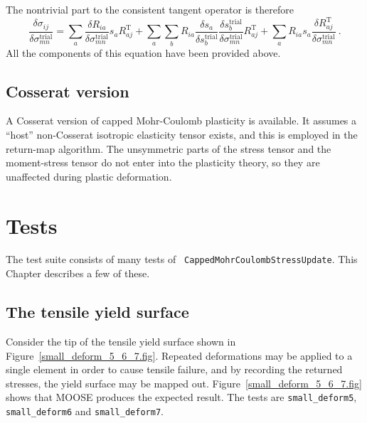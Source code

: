 \documentclass[]{scrreprt}
\begin{document}
The nontrivial part to the consistent tangent operator is therefore
\begin{equation}
  \frac{\delta \sigma_{ij}}{\delta\sigma_{mn}^{\mathrm{trial}}} =
\sum_{a}  \frac{\delta
    R_{ia}}{\delta\sigma_{mn}^{\mathrm{trial}}}s_{a}R_{aj}^{\mathrm{T}}
  + \sum_{a}\sum_{b} R_{ia}\frac{\delta s_{a}}{\delta s_{b}^{\mathrm{trial}}}
  \frac{\delta s_{b}^{\mathrm{trial}}}{\delta
    \sigma_{mn}^{\mathrm{trial}}}R_{aj}^{\mathrm{T}} +
  \sum_{a} R_{ia}s_{a}\frac{\delta
    R_{aj}^{\mathrm{T}}}{\delta\sigma_{mn}^{\mathrm{trial}}} \ .
\end{equation}
All the components of this equation have been provided above.

\section{Cosserat version}

A Cosserat version of capped Mohr-Coulomb plasticity is available.  It
assumes a ``host'' non-Cosserat isotropic elasticity tensor exists,
and this is employed in the return-map algorithm.  The unsymmetric parts
of the stress tensor and the moment-stress tensor do not enter into
the plasticity theory, so they are unaffected during plastic
deformation.


\chapter{Tests}

The test suite consists of many tests of {\tt
  CappedMohrCoulombStressUpdate}.  This Chapter describes a few of
these.

\section{The tensile yield surface}

Consider the tip of the tensile yield surface shown in
Figure~\ref{small_deform_5_6_7.fig}.  Repeated deformations may be
applied to a single element in order to cause tensile failure, and by
recording the returned stresses, the yield surface may be mapped out.
Figure~\ref{small_deform_5_6_7.fig} shows that MOOSE produces the
expected result.  The tests are {\tt small\_deform5}, {\tt
  small\_deform6} and {\tt small\_deform7}.
\end{document}
